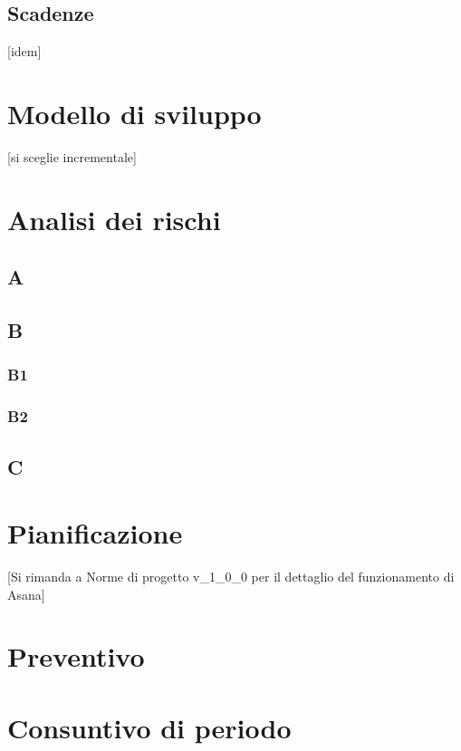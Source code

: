 	\subsection{Scadenze}
	[idem]

\section{Modello di sviluppo}
[si sceglie incrementale]


\section{Analisi dei rischi}
	\subsection{A}
	\subsection{B}
		\subsubsection{B1}
		\subsubsection{B2}
	\subsection{C}

\section{Pianificazione}
[Si rimanda a Norme di progetto v_1_0_0 per il dettaglio del funzionamento di Asana]
\section{Preventivo}
\section{Consuntivo di periodo}


